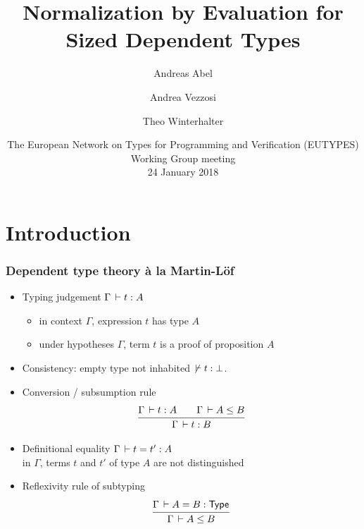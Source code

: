 \documentclass[t,fleqn]{beamer}
\title[NbE for Sized Dependent Types]{%
  Normalization by Evaluation for Sized Dependent Types}
\author[Abel Vezzosi Winterhalter]{
  Andreas Abel\inst{1}
  \and Andrea Vezzosi\inst{1}
  \and Theo Winterhalter\inst{2}
}
\institute[] %
{
  \inst{1}
  Department of Computer Science and Engineering\\
  Chalmers and Gothenburg University, Sweden \\[1ex]

  \inst{2}
  Université de Nantes, France \\
}
\date[EUTYPES WG'18] %
{ The European Network on Types for Programming and Verification (EUTYPES)\\
  Working Group meeting \\
  24 January 2018
}
\makeatletter
\renewcommand{\ru}[2]{\dfrac{\begin{array}[b]{@{}c@{}} #1 \end{array}}{\begin{array}[t]{@{}l@{}} #2 \end{array}}}
\def\MLine#1{\par\vspace{1ex}\hspace*{-\@totalleftmargin}\parbox{\textwidth}{\[#1\]}}
\newcommand{\cAnn}{\color{red!80!black}}%
\renewcommand{\emph}[1]{{\cAnn#1}}
\newcommand{\cType}{\color{orange!60!black}}
\makeatother
\begin{document}
\maketitle


%
%
%
%

\renewcommand{\emph}[1]{\textit{\cType#1}}

\section{Introduction}



\begin{frame}%
  \frametitle{Dependent type theory \`a la Martin-Löf}
  \vspace{-3ex}
  \begin{itemize}
  \item Typing judgement $\Gamma \,\vdash t : A$
    \begin{itemize}
    \item in context $\Gamma$, expression $t$ has type $A$
    \item under hypotheses $\Gamma$, term $t$ is a proof of
      proposition $A$
    \end{itemize}
  \item Consistency: empty type not inhabited $\not\,\vdash t : \bot$.
  \item Conversion / subsumption rule
    \[
      \ru{\Gamma \der t : A \qquad \Gamma \der A \leq B
        }{\Gamma \der t : B}
    \]
    \vspace{-2ex}
  \item Definitional equality $\Gamma \,\vdash t = t' : A$ \\
     in $\Gamma$, terms $t$ and $t'$ of type $A$ are not distinguished
  \item Reflexivity rule of subtyping
\[
      \ru{\Gamma \der A = B : \Type
        }{\Gamma \der A \leq B}
\]
  \end{itemize}
\end{frame}
\end{document}
